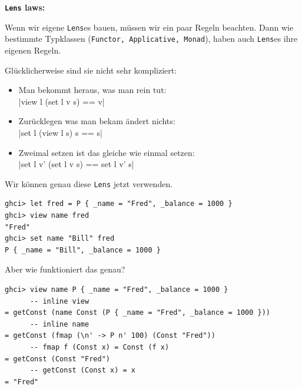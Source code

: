 \documentclass{beamer}
\begin{document}

\begin{frame}[fragile]
\textbf{\texttt{Lens} laws:}
\smallskip

Wenn wir eigene \texttt{Lens}es bauen, müssen wir ein paar Regeln beachten. Dann wie bestimmte
Typklassen (\texttt{Functor, Applicative, Monad}), haben auch \texttt{Lens}es ihre eigenen Regeln.\pause
\bigskip

Glücklicherweise sind sie nicht sehr kompliziert:
\begin{itemize}
\item Man bekommt heraus, was man rein tut:\\
|view l (set l v s)  == v|
\pause
\item Zurücklegen was man bekam ändert nichts:\\
|set l (view l s) s  == s|
\pause
\item Zweimal setzen ist das gleiche wie einmal setzen:\\
|set l v' (set l v s) == set l v' s|
\end{itemize}

\end{frame}


\begin{frame}[fragile]

Wir können genau diese \texttt{Lens} jetzt verwenden.
\pause

\begin{verbatim}
ghci> let fred = P { _name = "Fred", _balance = 1000 }
ghci> view name fred
"Fred"
ghci> set name "Bill" fred
P { _name = "Bill", _balance = 1000 }
\end{verbatim}
\pause

Aber wie funktioniert das genau?\pause

\begin{verbatim}
ghci> view name P { _name = "Fred", _balance = 1000 }
      -- inline view
= getConst (name Const (P { _name = "Fred", _balance = 1000 }))
      -- inline name
= getConst (fmap (\n' -> P n' 100) (Const "Fred"))
      -- fmap f (Const x) = Const (f x)
= getConst (Const "Fred")
      -- getConst (Const x) = x
= "Fred"
\end{verbatim}

\end{frame}
\end{document}
